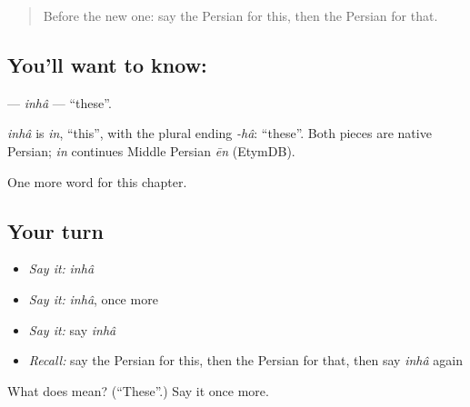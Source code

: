 \label{lesson:FA-C82-inha}



\begin{quote}
Before the new one: say the Persian for this, then the Persian for that.
\end{quote}

\subsection*{You'll want to know: }
\textbf{} — \emph{inhâ} — \textquotedblleft{}these\textquotedblright{}.

\begin{cousinweb}
\emph{inhâ} is \emph{in}, \textquotedblleft{}this\textquotedblright{}, with the plural ending \emph{-hâ}: \textquotedblleft{}these\textquotedblright{}. Both pieces are native Persian; \emph{in} continues Middle Persian \emph{ēn} (EtymDB).
\end{cousinweb}

\begin{grammarlens}[title={What you've built}]
One more word for this chapter.
\end{grammarlens}

\subsection*{Your turn}
\begin{itemize}
\raggedright
  \item \emph{Say it:} \emph{inhâ}
  \item \emph{Say it:} \emph{inhâ}, once more
  \item \emph{Say it:} say \emph{inhâ}
  \item \emph{Recall:} say the Persian for this, then the Persian for that, then say \emph{inhâ} again
\end{itemize}

\begin{tcolorbox}[breakable,colback=teal!4,colframe=teal!35!black,title={Before you move on}]
What does  mean? (\textquotedblleft{}These\textquotedblright{}.) Say it once more.
\end{tcolorbox}
